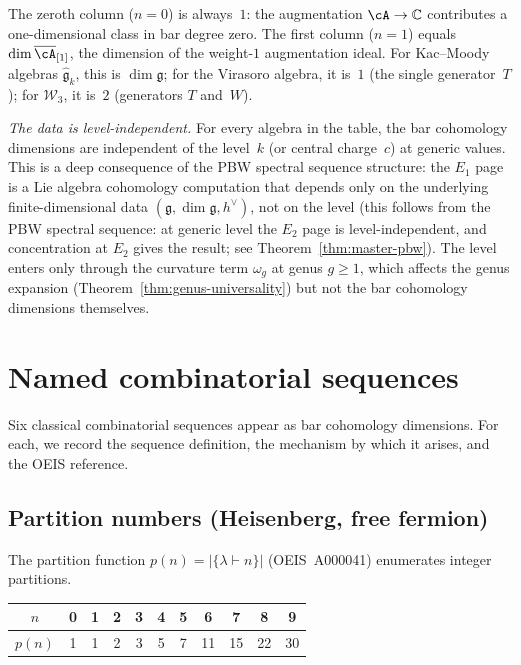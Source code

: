 \begin{remark}
\label{rem:reading-frontier-table}
The zeroth column ($n=0$) is always~$1$: the augmentation $\cA \to \mathbb{C}$ contributes a one-dimensional class in bar degree zero. The first column ($n=1$) equals $\dim\overline{\cA}_{[1]}$, the dimension of the weight-$1$ augmentation ideal. For Kac--Moody algebras $\widehat{\mathfrak{g}}_k$, this is $\dim\mathfrak{g}$; for the Virasoro algebra, it is~$1$ (the single generator~$T$); for $\mathcal{W}_3$, it is~$2$ (generators $T$ and~$W$).

\emph{The data is level-independent.} For every algebra in the table, the bar cohomology dimensions are independent of the level~$k$ (or central charge~$c$) at generic values. This is a deep consequence of the PBW spectral sequence structure: the $E_1$ page is a Lie algebra cohomology computation that depends only on the underlying finite-dimensional data $(\mathfrak{g}, \dim\mathfrak{g}, h^\vee)$, not on the level (this follows from the PBW spectral sequence: at generic level the $E_2$ page is level-independent, and concentration at $E_2$ gives the result; see Theorem~\ref{thm:master-pbw}). The level enters only through the curvature term $\omega_g$ at genus $g \geq 1$, which affects the genus expansion (Theorem~\ref{thm:genus-universality}) but not the bar cohomology dimensions themselves.
\end{remark}

\section{Named combinatorial sequences}
\label{sec:named-sequences}

Six classical combinatorial sequences appear as bar cohomology dimensions. For each, we record the sequence definition, the mechanism by which it arises, and the OEIS reference.

\subsection{Partition numbers (Heisenberg, free fermion)}
\label{subsec:partition-numbers}

The partition function $p(n) = |\{\lambda \vdash n\}|$ (OEIS~A000041) enumerates integer partitions.

\begin{center}
\renewcommand{\arraystretch}{1.2}
\begin{tabular}{c|cccccccccc}
$n$ & 0 & 1 & 2 & 3 & 4 & 5 & 6 & 7 & 8 & 9 \\
\hline
$p(n)$ & 1 & 1 & 2 & 3 & 5 & 7 & 11 & 15 & 22 & 30
\end{tabular}
\end{center}


